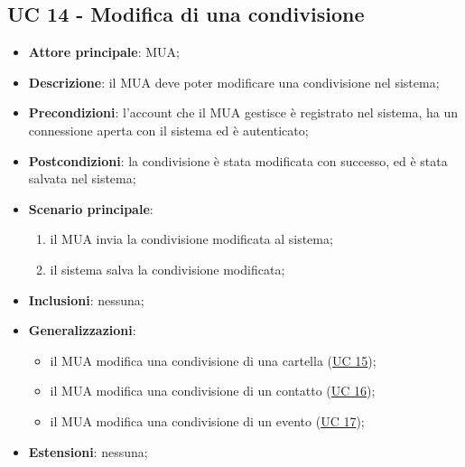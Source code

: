 \subsection{UC 14 - Modifica di una condivisione} \label{sec:UC14}
    \begin{itemize}
        \item \textbf{Attore principale}: MUA;
        \item \textbf{Descrizione}: il MUA deve poter modificare una condivisione nel sistema;
        \item \textbf{Precondizioni}: l’account che il MUA gestisce è registrato nel sistema, ha un connessione aperta con il sistema ed è autenticato;
        \item \textbf{Postcondizioni}: la condivisione è stata modificata con successo, ed è stata salvata nel sistema;
        \item \textbf{Scenario principale}:
            \begin{enumerate}
                \item il MUA invia la condivisione modificata al sistema;
                \item il sistema salva la condivisione modificata;
            \end{enumerate}
        \item \textbf{Inclusioni}: nessuna;
        \item \textbf{Generalizzazioni}:
            \begin{itemize}
                \item il MUA modifica una condivisione di una cartella (\hyperref[sec:UC15]{UC 15});
                \item il MUA modifica una condivisione di un contatto (\hyperref[sec:UC16]{UC 16});
                \item il MUA modifica una condivisione di un evento (\hyperref[sec:UC17]{UC 17});
            \end{itemize}
        \item \textbf{Estensioni}: nessuna;
    \end{itemize}